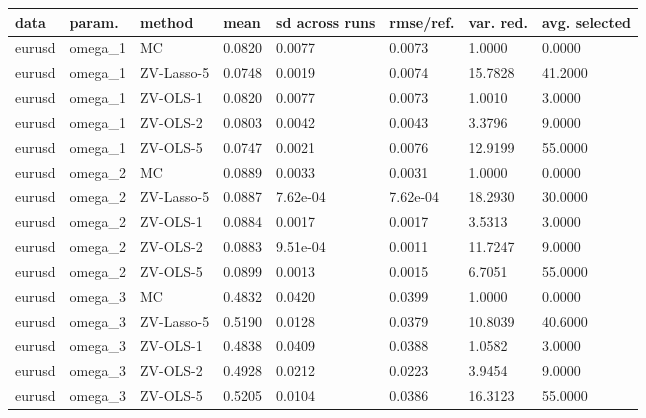\begin{tabular}{llllllll}
\toprule
data & param. & method & mean & sd across runs & rmse/ref. & var. red. & avg. selected \\
\midrule
eurusd & omega\_1 & MC & 0.0820 & 0.0077 & 0.0073 & 1.0000 & 0.0000 \\
eurusd & omega\_1 & ZV-Lasso-5 & 0.0748 & 0.0019 & 0.0074 & 15.7828 & 41.2000 \\
eurusd & omega\_1 & ZV-OLS-1 & 0.0820 & 0.0077 & 0.0073 & 1.0010 & 3.0000 \\
eurusd & omega\_1 & ZV-OLS-2 & 0.0803 & 0.0042 & 0.0043 & 3.3796 & 9.0000 \\
eurusd & omega\_1 & ZV-OLS-5 & 0.0747 & 0.0021 & 0.0076 & 12.9199 & 55.0000 \\
eurusd & omega\_2 & MC & 0.0889 & 0.0033 & 0.0031 & 1.0000 & 0.0000 \\
eurusd & omega\_2 & ZV-Lasso-5 & 0.0887 & 7.62e-04 & 7.62e-04 & 18.2930 & 30.0000 \\
eurusd & omega\_2 & ZV-OLS-1 & 0.0884 & 0.0017 & 0.0017 & 3.5313 & 3.0000 \\
eurusd & omega\_2 & ZV-OLS-2 & 0.0883 & 9.51e-04 & 0.0011 & 11.7247 & 9.0000 \\
eurusd & omega\_2 & ZV-OLS-5 & 0.0899 & 0.0013 & 0.0015 & 6.7051 & 55.0000 \\
eurusd & omega\_3 & MC & 0.4832 & 0.0420 & 0.0399 & 1.0000 & 0.0000 \\
eurusd & omega\_3 & ZV-Lasso-5 & 0.5190 & 0.0128 & 0.0379 & 10.8039 & 40.6000 \\
eurusd & omega\_3 & ZV-OLS-1 & 0.4838 & 0.0409 & 0.0388 & 1.0582 & 3.0000 \\
eurusd & omega\_3 & ZV-OLS-2 & 0.4928 & 0.0212 & 0.0223 & 3.9454 & 9.0000 \\
eurusd & omega\_3 & ZV-OLS-5 & 0.5205 & 0.0104 & 0.0386 & 16.3123 & 55.0000 \\
\bottomrule
\end{tabular}
